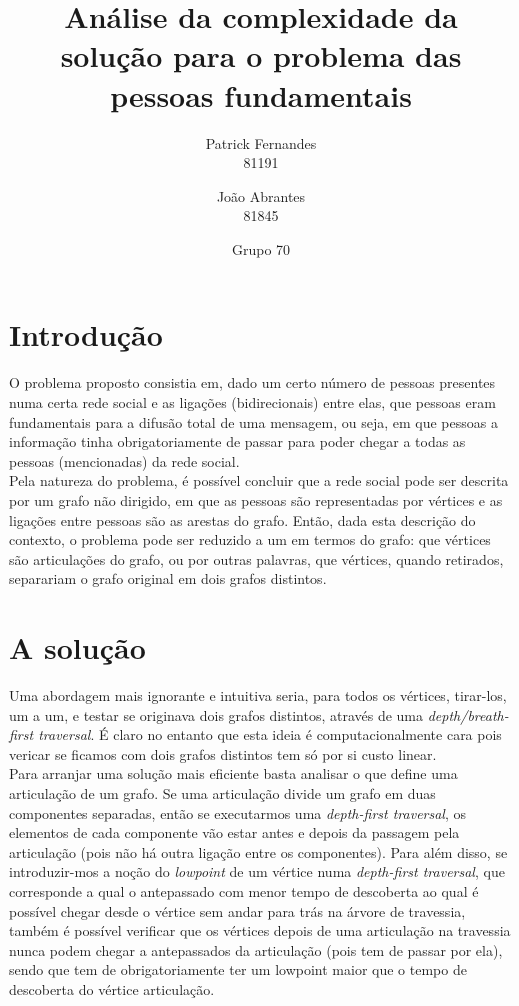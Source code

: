\documentclass[12pt]{article}
\title{Análise da complexidade da solução para o problema das pessoas fundamentais}
\author{Patrick Fernandes\\81191 \and João Abrantes\\81845}
\date{Grupo 70}
\begin{document}
\maketitle
\section{Introdução}
O problema proposto consistia em, dado um certo número de pessoas presentes numa certa rede social e as ligações (bidirecionais) entre elas, que pessoas eram fundamentais para a difusão total de uma mensagem, ou seja, em que pessoas a informação tinha obrigatoriamente de passar para poder chegar a todas as pessoas (mencionadas) da rede social.\\
Pela natureza do problema, é possível concluir que a rede social pode ser descrita por um grafo não dirigido, em que as pessoas são representadas por vértices e as ligações entre pessoas são as arestas do grafo. Então, dada esta descrição do contexto, o problema pode ser reduzido a um em termos do grafo: que vértices são articulações do grafo, ou por outras palavras, que vértices, quando retirados, separariam o grafo original em dois grafos distintos.
\section{A solução}
Uma abordagem mais ignorante e intuitiva seria, para todos os vértices, tirar-los, um a um, e testar se originava dois grafos distintos, através de uma \textit{depth/breath-first traversal}. É claro no entanto que esta ideia é computacionalmente cara pois vericar se ficamos com dois grafos distintos tem só por si custo linear. \\ 
Para arranjar uma solução mais eficiente basta analisar o que define uma articulação de um grafo. Se uma articulação divide um grafo em duas componentes separadas, então se executarmos uma \textit{depth-first traversal}, os elementos de cada componente vão estar antes e depois da passagem pela articulação (pois não há outra ligação entre os componentes). Para além disso, se introduzir-mos a noção do \textit{lowpoint} de um vértice numa \textit{depth-first traversal}, que corresponde a qual o antepassado com menor tempo de descoberta ao qual é possível chegar desde o vértice sem andar para trás na árvore de travessia, também é possível verificar que os vértices depois de uma articulação na travessia nunca podem chegar a antepassados da articulação (pois tem de passar por ela), sendo que tem de obrigatoriamente ter um lowpoint maior que o tempo de descoberta do vértice articulação.\\
\end{document}
